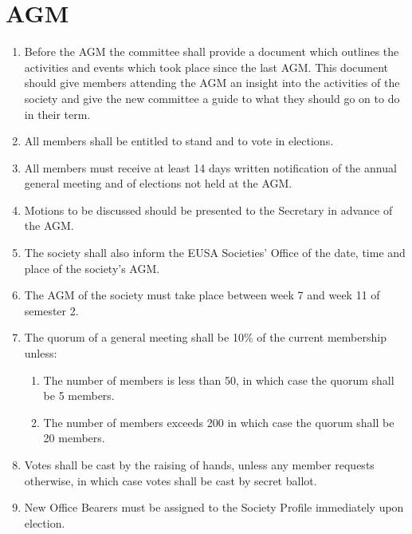 \section{AGM}

\begin{enumerate}

\item Before the AGM the committee shall provide a document which outlines the activities and events which took place since the last AGM\@. This document should give members attending the AGM an insight into the activities of the society and give the new committee a guide to what they should go on to do in their term.

\item All members shall be entitled to stand and to vote in elections.

\item All members must receive at least 14 days written notification of the annual general meeting and of elections not held at the AGM\@.

\item Motions to be discussed should be presented to the Secretary in advance of the AGM\@.

\item The society shall also inform the EUSA Societies' Office of the date, time and place of the society's AGM\@.

\item The AGM of the society must take place between week 7 and week 11 of semester 2.

\item The quorum of a general meeting shall be 10\% of the current membership unless:
  \begin{enumerate}
  \item The number of members is less than 50, in which case the quorum shall be 5 members.
  \item The number of members exceeds 200 in which case the quorum shall be 20 members.
  \end{enumerate}

\item Votes shall be cast by the raising of hands, unless any member requests otherwise, in which case votes shall be cast by secret ballot.

\item New Office Bearers must be assigned to the Society Profile immediately upon election.


\end{enumerate}
